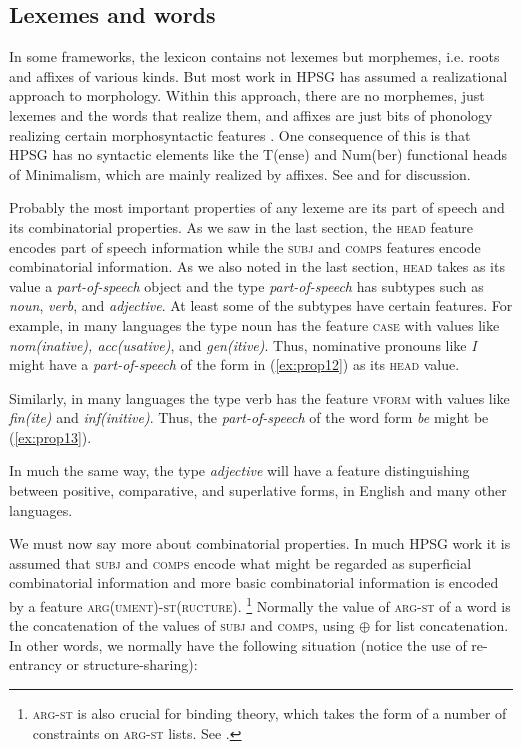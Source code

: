\documentclass[output=paper
	        ,collection
	        ,collectionchapter
 	        ,biblatex
                ,babelshorthands
                ,newtxmath
                ,draftmode
                ,colorlinks, citecolor=brown
]{langscibook}
\begin{document}
\subsection{Lexemes and words}

In some frameworks, the lexicon contains not lexemes but morphemes, i.e. roots and affixes of various kinds. But most work in HPSG has assumed a realizational approach to morphology. Within this approach, there are no morphemes, just lexemes and the words that realize them, and affixes are just bits of phonology realizing certain morphosyntactic features \citep{Stump2001a-u-kopiert,Anderson92a-u}. One consequence of this is that HPSG has no syntactic elements like the T(ense) and Num(ber) functional heads of Minimalism, which are mainly realized by affixes. See  and  for discussion.

Probably the most important properties of any lexeme are its part of speech and its combinatorial properties. As we saw in the last section, the \textsc{head} feature encodes part of speech information while the \textsc{subj} and \textsc{comps} features encode combinatorial information. As we also noted in the last section, \textsc{head} takes as its value a \emph{part-of-speech} object and the type \emph{part-of-speech} has subtypes such as \emph{noun}, \emph{verb}, and \emph{adjective}. At least some of the subtypes have certain features. For example, in many languages the type noun has the feature \textsc{case} with values like \emph{nom(inative), acc(usative)}, and \emph{gen(itive)}. Thus, nominative pronouns like \emph{I} might have a \emph{part-of-speech} of the form in (\ref{ex:prop12}) as its \textsc{head} value.

\ea\label{ex:prop12}
\z

Similarly, in many languages the type verb has the feature \textsc{vform} with values like \emph{fin(ite)} and \emph{inf(initive)}. Thus, the \emph{part-of-speech} of the word form \emph{be} might be (\ref{ex:prop13}).

\ea\label{ex:prop13}
\z

In much the same way, the type \emph{adjective} will have a feature distinguishing between positive, comparative, and superlative forms, in English and many other languages.

We must now say more about combinatorial properties. In much HPSG work it is assumed that \textsc{subj} and \textsc{comps} encode what might be regarded as superficial combinatorial information and more basic combinatorial information is encoded by a feature \textsc{arg(ument)-st(ructure)}.%
%
\footnote{\textsc{arg-st} is also crucial for binding theory, which takes the form of a number of constraints on \textsc{arg-st} lists. See .}
%
Normally the value of \textsc{arg-st} of a word is the concatenation of the values of \textsc{subj} and \textsc{comps}, using $\oplus$ for list concatenation. In other words, we normally have the following situation (notice the use of re-entrancy or structure-sharing):
\end{document}
